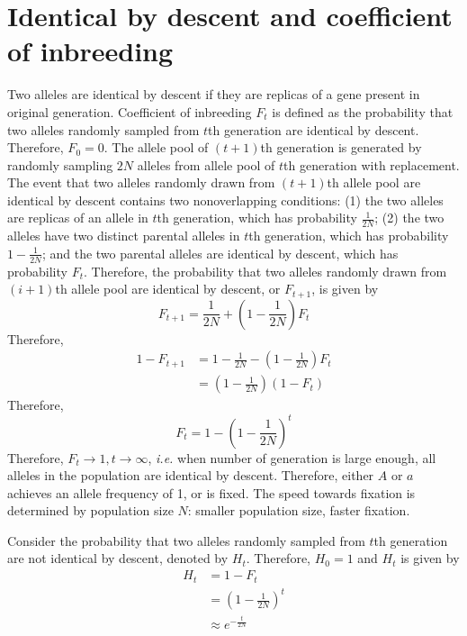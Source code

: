 \documentclass[11pt]{article}
\begin{document}
\begin{sloppypar}
\section{Identical by descent and coefficient of inbreeding}
Two alleles are identical by descent if they are replicas of a gene present in original generation. 
Coefficient of inbreeding $F_t$ is defined as the probability that two alleles randomly sampled from $t$th generation are identical by descent. 
Therefore, $F_0 = 0$. 
The allele pool of $(t+1)$th generation is generated by randomly sampling $2N$ alleles from allele pool of $t$th generation with replacement. 
The event that two alleles randomly drawn from $(t+1)$th allele pool are identical by descent contains two nonoverlapping conditions: 
(1) the two alleles are replicas of an allele in $t$th generation, which has probability $\frac{1}{2N}$; 
(2) the two alleles have two distinct parental alleles in $t$th generation, which has probability $1-\frac{1}{2N}$; and the two parental alleles are identical by descent, which has probability $F_t$. 
Therefore, the probability that two alleles randomly drawn from $(i+1)$th allele pool are identical by descent, or $F_{t+1}$, is given by 
\begin{equation}
  F_{t+1} = \frac{1}{2N} + (1-\frac{1}{2N})F_t
\end{equation}
Therefore,
\begin{equation}
\begin{align}
  1-F_{t+1} &= 1-\frac{1}{2N} - (1-\frac{1}{2N})F_t \\
            &= (1-\frac{1}{2N})(1-F_t)
\end{align}
\end{equation}
Therefore, 
\begin{equation}
  F_t = 1-(1-\frac{1}{2N})^t
\end{equation}
Therefore, $F_t \rightarrow 1, t \rightarrow \infty$, \textit{i.e.} when number of generation is large enough, all alleles in the population are identical by descent. 
Therefore, either $A$ or $a$ achieves an allele frequency of 1, or is fixed. 
The speed towards fixation is determined by population size $N$: smaller population size, faster fixation.

\par

Consider the probability that two alleles randomly sampled from $t$th generation are not identical by descent, denoted by $H_t$. 
Therefore, $H_0=1$ and $H_t$ is given by 
\begin{equation}
\begin{align}
  H_t &= 1-F_t \\
      &= (1-\frac{1}{2N})^t \\
      &\approx e^{-\frac{t}{2N}}
\end{align}
\end{equation}


\end{sloppypar}
\end{document}
